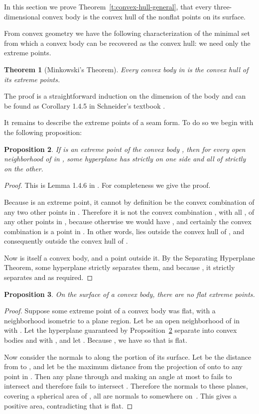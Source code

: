 \documentclass{article}
\newtheorem{theorem}{Theorem}
\newtheorem{proposition}[theorem]{Proposition}
\begin{document}
In this section we prove Theorem~\ref{t:convex-hull-general}, that
every three-dimensional convex body is the convex hull of the nonflat
points on its surface.

From convex geometry we have the following characterization of the
minimal set from which a convex body can be recovered as the convex
hull: we need only the extreme points.
\begin{theorem}[Minkowski's Theorem]\label{t:hull-of-extreme}
  Every convex body in  is the convex hull of its extreme points.
\end{theorem}
The proof is a straightforward induction on the dimension of the body
and can be found as Corollary 1.4.5 in Schneider's textbook
\cite{Schneider}.

It remains to describe the extreme points of a seam form.  To do so we
begin with the following proposition:
\begin{proposition}\label{p:extreme-separate}
  If  is an extreme point of the convex body , then for every
  open neighborhood  of  in , some hyperplane has 
  strictly on one side and all of  strictly on the other.
\end{proposition}
\begin{proof}
  This is Lemma 1.4.6 in \cite{Schneider}.  For completeness we
  give the proof.

  Because  is an extreme point, it cannot by definition be the
  convex combination of any two other points in .  Therefore it is
  not the convex combination , with all , of any  other points in , because otherwise we would
  have , and certainly the convex
  combination  is a point in .  In other words,
   lies outside the convex hull of , and
  consequently outside the convex hull  of .

  Now  is itself a convex body, and  a point outside it.  By the
  Separating Hyperplane Theorem, some hyperplane strictly separates
  them, and because , it strictly separates 
  and  as required.
\end{proof}

\begin{proposition}\label{p:flat-no-extreme}
  On the surface of a convex body, there are no flat extreme points.
\end{proposition}
\begin{proof}
  Suppose some extreme point  of a convex body  was flat,
  with a neighborhood  isometric to a plane region.
  Let  be an open neighborhood of  in  with .  Let the hyperplane  guaranteed by
  Proposition~\ref{p:extreme-separate} separate  into convex bodies
   and  with , and let .  Because , we have  so that  is flat.

  Now consider the normals to  along the portion  of its
  surface.  Let  be the distance from  to , and let  be
  the maximum distance from the projection of  onto  to any
  point in .  Then any plane through  and making an angle
  at most  to  fails to intersect  and
  therefore fails to intersect .  Therefore the normals to these
  planes, covering a spherical area of ,
  all are normals to  somewhere on~.  This gives 
  a positive area, contradicting that  is flat.
\end{proof}
\end{document}
